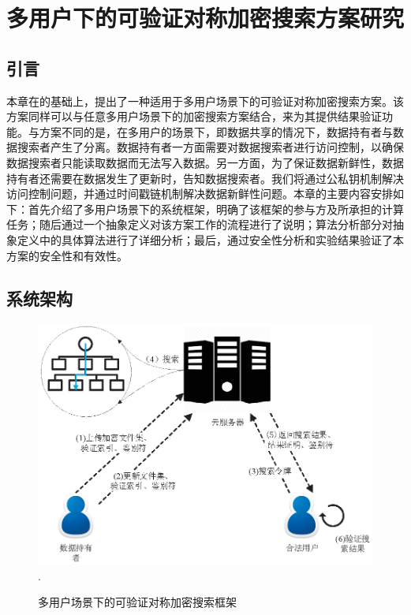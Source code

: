 \chapter{多用户下的可验证对称加密搜索方案研究}
\label{cha:multi-user}
\section{引言}
本章在\single 的基础上，提出了一种适用于多用户场景下的可验证对称加密搜索方案\multi 。该方案同样可以与任意多用户场景下的加密搜索方案结合，来为其提供结果验证功能。与\single 方案不同的是，在多用户的场景下，即数据共享的情况下，数据持有者与数据搜索者产生了分离。数据持有者一方面需要对数据搜索者进行访问控制，以确保数据搜索者只能读取数据而无法写入数据。另一方面，为了保证数据新鲜性，数据持有者还需要在数据发生了更新时，告知数据搜索者。我们将通过公私钥机制解决访问控制问题，并通过时间戳链机制解决数据新鲜性问题。本章的主要内容安排如下：首先介绍了多用户场景下的系统框架，明确了该框架的参与方及所承担的计算任务；随后通过一个抽象定义对该方案工作的流程进行了说明；算法分析部分对抽象定义中的具体算法进行了详细分析；最后，通过安全性分析和实验结果验证了本方案的安全性和有效性。



\section{系统架构}

\begin{figure}[t]
\centering
\includegraphics[width=6 in]{fig/GM-VSSE}
\DeclareGraphicsExtensions.
\caption{多用户场景下的可验证对称加密搜索框架\multi}
\label{fig:GM-VSSE}
\end{figure}

